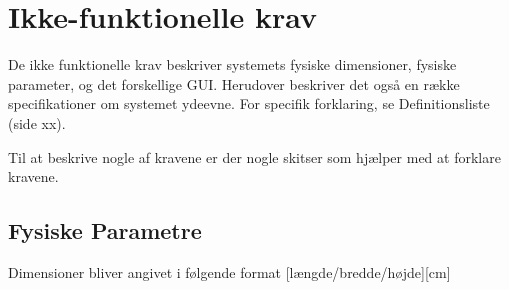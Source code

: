 \documentclass[Kravspecifikation/Kravspec_Main.tex]{subfiles}
\begin{document}
\section{Ikke-funktionelle krav}\label{sec:ikke_funktionelle_krav}
De ikke funktionelle krav beskriver systemets fysiske dimensioner, fysiske parameter, og det forskellige GUI. Herudover beskriver det også en række specifikationer om systemet ydeevne. For specifik forklaring, se Definitionsliste (side xx).

Til at beskrive nogle af kravene er der nogle skitser som hjælper med at forklare kravene. 
\subsection{Fysiske Parametre}
Dimensioner bliver angivet i følgende format [længde/bredde/højde][cm]
\end{document}
